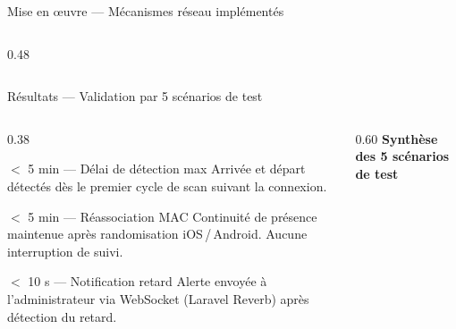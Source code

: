 \documentclass[aspectratio=169, 10pt]{beamer}
\begin{document}
\begin{frame}{Mise en \oe uvre --- Mécanismes réseau implémentés}
\begin{columns}[T]
\begin{column}{0.48\textwidth}
      \vspace{0.2cm}
    \end{column}
  \end{columns}
\end{frame}

\begin{frame}{Résultats --- Validation par 5 scénarios de test}
  \begin{columns}[T]
    \begin{column}{0.38\textwidth}
      \begin{exampleblock}{\scriptsize $<$ 5 min --- Délai de détection max}
        \tiny Arrivée et départ détectés dès le premier cycle de scan suivant la connexion.
      \end{exampleblock}
      \vspace{4pt}
      \begin{exampleblock}{\scriptsize $<$ 5 min --- Réassociation MAC}
        \tiny Continuité de présence maintenue après randomisation iOS\,/\,Android. Aucune interruption de suivi.
      \end{exampleblock}
      \vspace{4pt}
      \begin{exampleblock}{\scriptsize $<$ 10 s --- Notification retard}
        \tiny Alerte envoyée à l'administrateur via WebSocket (Laravel Reverb) après détection du retard.
      \end{exampleblock}
    \end{column}
    \begin{column}{0.60\textwidth}
      \textbf{\textcolor{EMESblue}{\small Synthèse des 5 scénarios de test}}
      \vspace{0.15cm}


\end{column}
\end{columns}
\end{frame}
\end{document}
